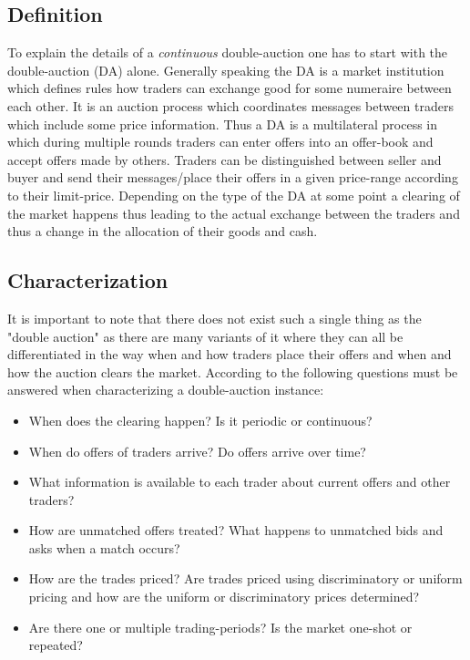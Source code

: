 \documentclass[../Bachelorarbeit.tex]{subfiles}
\begin{document}
\subsection{Definition}
To explain the details of a \textit{continuous} double-auction one has to start with the double-auction (DA) alone. Generally speaking the DA is a \gls{market institution} which defines rules how traders can exchange \gls{good} for some \gls{numeraire} between each other. It is an \gls{auction} process which coordinates messages between traders which include some price information. Thus a DA is a multilateral process in which during multiple \glspl{round} traders can enter \glspl{offer} into an \gls{offer-book} and accept offers made by others. Traders can be distinguished between \gls{seller} and \gls{buyer} and send their messages/place their offers in a given price-range according to their \gls{limit-price}. Depending on the type of the DA at some point a \gls{clearing} of the market happens thus leading to the actual exchange between the traders and thus a change in the allocation of their goods and cash. \cite{Parsons2006}

\subsection{Characterization}
It is important to note that there does not exist such a single thing as the "double auction" as there are many variants of it where they can all be differentiated in the way when and how traders place their offers and when and how the auction clears the market. According to \cite{Parsons2006} the following questions must be answered when characterizing a double-auction instance:

\begin{itemize}
\item When does the clearing happen? Is it periodic or continuous?
\item When do offers of traders arrive? Do offers arrive over time?
\item What information is available to each trader about current offers and other traders?
\item How are unmatched offers treated? What happens to unmatched bids and asks when a match occurs?
\item How are the trades priced? Are trades priced using discriminatory or uniform pricing and how are the uniform or discriminatory prices determined?
\item Are there one or multiple trading-periods? Is the market one-shot or repeated?
\end{itemize}
\end{document}
